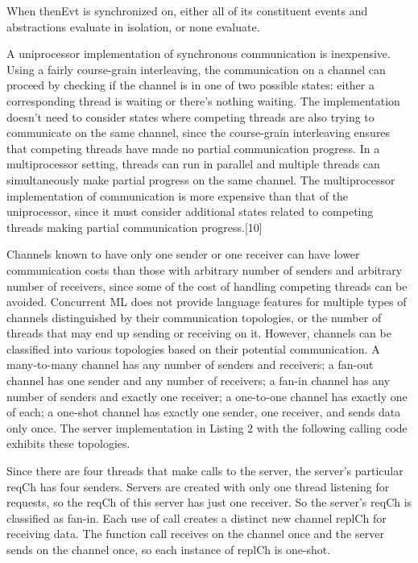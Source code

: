 \documentclass{article}
\begin{document}
When  thenEvt is synchronized on, either all of its constituent events and abstractions
evaluate in isolation, or none evaluate.


A uniprocessor implementation of synchronous communication is inexpensive.  Using a fairly
course-grain interleaving, the communication on a channel can proceed by checking if the
channel is in one of two possible states: either a corresponding thread is waiting or there's
nothing waiting.  The implementation doesn't need to consider states where competing threads
are also trying to communicate on the same channel, since the course-grain interleaving ensures
that competing threads have made no partial communication progress.  In a multiprocessor
setting, threads can run in parallel and multiple threads can simultaneously make partial
progress on the same channel.  The multiprocessor implementation of communication is more
expensive than that of the uniprocessor, since it must consider additional states related to
competing threads making partial communication progress.[10]

Channels known to have only one sender or one receiver can have lower communication costs than
those with arbitrary number of senders and arbitrary number of receivers, since some of the
cost of handling competing threads can be avoided.  Concurrent ML does not provide language
features for multiple types of channels distinguished by their communication topologies, or the
number of threads that may end up sending or receiving on it.  However, channels can be
classified into various topologies based on their potential communication.  A many-to-many
channel has any number of senders and receivers; a fan-out channel has one sender and any
number of receivers; a fan-in channel has any number of senders and exactly one receiver; a
one-to-one channel has exactly one of each; a one-shot channel has exactly one sender, one
receiver, and sends data only once.  The server implementation in Listing 2  with the following
calling code exhibits these topologies.


Since there are four threads that make calls to the server, the server's particular reqCh has
four senders.  Servers are created with only one thread listening for requests, so the reqCh of
this server has just one receiver.  So the server's reqCh is classified as fan-in.  Each use of
call creates a distinct new channel replCh for receiving data.  The function call receives on
the channel once and the server sends on the channel once, so each instance of replCh is
one-shot.
\end{document}
